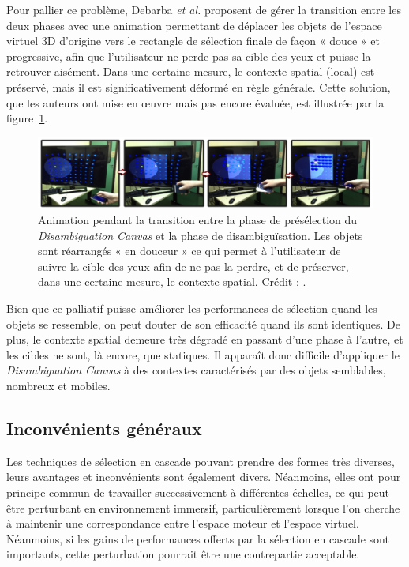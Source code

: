 	Pour pallier ce problème, Debarba \emph{et al.} proposent de gérer la transition entre les deux phases avec une animation permettant de déplacer les objets de l'espace virtuel 3D d'origine vers le rectangle de sélection finale de façon « douce » et progressive, afin que l'utilisateur ne perde pas sa cible des yeux et puisse la retrouver aisément. Dans une certaine mesure, le contexte spatial (local) est préservé, mais il est significativement déformé en règle générale. Cette solution, que les auteurs ont mise en \oe{}uvre mais pas encore évaluée, est illustrée par la figure~\ref{fig:dCanvasContext}.
	
	\begin{figure}[H]
		\centering
		\includegraphics[width=\textwidth]{figures/ch2/dCanvasContext}
		\caption[\emph{Disambiguation Canvas} --- Animation de transition]{Animation pendant la transition entre la phase de présélection du \emph{Disambiguation Canvas} et la phase de disambiguïsation. Les objets sont réarrangés « en douceur » ce qui permet à l'utilisateur de suivre la cible des yeux afin de ne pas la perdre, et de préserver, dans une certaine mesure, le contexte spatial. Crédit : \cite{debarba2013disambiguation}.}
		\label{fig:dCanvasContext}
	\end{figure}
	
	Bien que ce palliatif puisse améliorer les performances de sélection quand les objets se ressemble, on peut douter de son efficacité quand ils sont identiques. De plus, le contexte spatial demeure très dégradé en passant d'une phase à l'autre, et les cibles ne sont, là encore, que statiques. Il apparaît donc difficile d'appliquer le \emph{Disambiguation Canvas} à des contextes caractérisés par des objets semblables, nombreux et mobiles.
	
	\subsection{Inconvénients généraux}
	Les techniques de sélection en cascade pouvant prendre des formes très diverses, leurs avantages et inconvénients sont également divers. Néanmoins, elles ont pour principe commun de travailler successivement à différentes échelles, ce qui peut être perturbant en environnement immersif, particulièrement lorsque l'on cherche à maintenir une correspondance entre l'espace moteur et l'espace virtuel. Néanmoins, si les gains de performances offerts par la sélection en cascade sont importants, cette perturbation pourrait être une contrepartie acceptable.
	
